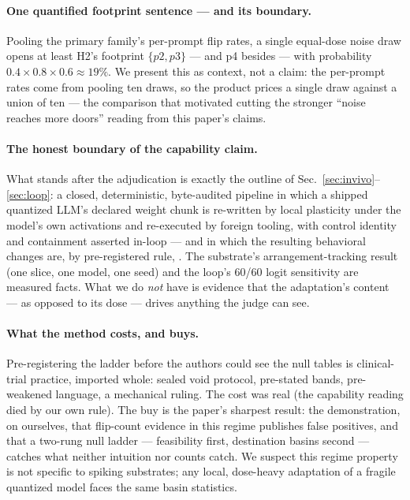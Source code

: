 \paragraph{One quantified footprint sentence --- and its boundary.}
Pooling the primary family's per-prompt flip rates, a single
equal-dose noise draw opens at least H2's footprint $\{p2, p3\}$ ---
and p4 besides --- with probability $0.4 \times 0.8 \times 0.6 \approx
19\%$. We present this as context, not a claim: the per-prompt rates
come from pooling ten draws, so the product prices a single draw
against a union of ten --- the comparison that motivated cutting the
stronger ``noise reaches more doors'' reading from this paper's claims.

\paragraph{The honest boundary of the capability claim.}
What stands after the adjudication is exactly the outline of
Sec.~\ref{sec:invivo}--\ref{sec:loop}: a closed, deterministic,
byte-audited pipeline in which a shipped quantized LLM's declared
weight chunk is re-written by local plasticity under the model's own
activations and re-executed by foreign tooling, with control identity
and containment asserted in-loop --- and in which the resulting
behavioral changes are, by pre-registered rule, \unattrib{}. The
substrate's arrangement-tracking result (one slice, one model, one
seed) and the loop's 60/60 logit sensitivity are measured facts. What
we do \emph{not} have is evidence that the adaptation's content ---
as opposed to its dose --- drives anything the judge can see.

\paragraph{What the method costs, and buys.}
Pre-registering the ladder before the authors could see the null
tables is clinical-trial practice, imported whole: sealed void
protocol, pre-stated bands, pre-weakened language, a mechanical
ruling. The cost was real (the capability reading died by our own
rule). The buy is the paper's sharpest result: the demonstration,
on ourselves, that flip-count evidence in this regime publishes false
positives, and that a two-rung null ladder --- feasibility first,
destination basins second --- catches what neither intuition nor
counts catch. We suspect this regime property is not specific to
spiking substrates; any local, dose-heavy adaptation of a fragile
quantized model faces the same basin statistics.
